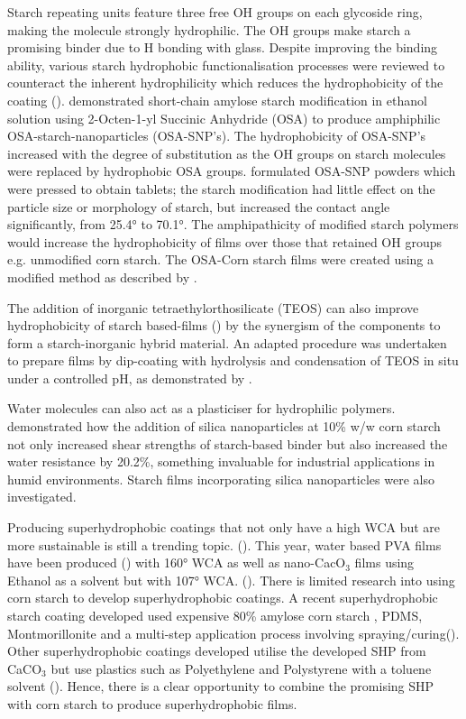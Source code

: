 \par Starch repeating units feature three free OH groups on each glycoside ring, making the molecule strongly hydrophilic. The OH groups make starch a promising binder due to H bonding with glass. Despite improving the binding ability, various starch hydrophobic functionalisation processes were reviewed to counteract the inherent hydrophilicity which reduces the hydrophobicity of the coating (\cite{wang}). \cite{jiang_dai_qin_xiong_sun_2016} demonstrated short-chain amylose starch modification in ethanol solution using 2-Octen-1-yl Succinic Anhydride (OSA) to produce amphiphilic OSA-starch-nanoparticles (OSA-SNP’s). The hydrophobicity of OSA-SNP’s increased with the degree of substitution as the OH groups on starch molecules were replaced by hydrophobic OSA groups. \cite{yu_jiang_zheng_cao_hou_xu_wang_jiang_pan_2019} formulated OSA-SNP powders which were pressed to obtain tablets; the starch modification had little effect on the particle size or morphology of starch, but increased the contact angle significantly, from 25.4° to 70.1°. The amphipathicity of modified starch polymers would increase the hydrophobicity of films over those that retained OH groups e.g.  unmodified corn starch. The OSA-Corn starch films were created using a modified method as described by \cite{OMSProcess}. 
\par The addition of inorganic tetraethylorthosilicate (TEOS) can also improve hydrophobicity of starch based-films (\cite{TEOS}) by the synergism of the components to form a starch-inorganic hybrid material. An adapted procedure was undertaken to prepare films by dip-coating with hydrolysis and condensation of TEOS in situ under a controlled pH, as demonstrated by \cite{TEOS}. 
\par Water molecules can also act as a plasticiser for hydrophilic polymers. \cite{wang_gu_hong_cheng_li_2011} demonstrated how the addition of silica nanoparticles at 10\% w/w corn starch not only increased shear strengths of starch-based binder but also increased the water resistance by 20.2\%, something invaluable for industrial applications in humid environments. Starch films incorporating silica nanoparticles were also investigated.

Producing superhydrophobic coatings that not only have a high WCA but are more sustainable is still a trending topic. (\cite{ECOSHS}). This year, water based PVA films have been produced (\cite{rewritable}) with 160° WCA as well as nano-CacO$_3$  films using Ethanol as a solvent but with 107° WCA. (\cite{syafiq_vengadaesvaran_ahmed_rahim_pandey_bushroa_ramesh_ramesh_2020}). There is limited research into using corn starch to develop superhydrophobic coatings. A recent superhydrophobic starch coating developed used expensive 80\% amylose corn starch , PDMS, Montmorillonite and a multi-step application process involving spraying/curing(\cite{chen_liu_yu_duan_ji_chen_2020}). Other superhydrophobic coatings developed utilise the developed SHP from CaCO$_3$ but use plastics such as Polyethylene and Polystyrene with a toluene solvent (\cite{Vatsal}).  Hence, there is a clear opportunity to combine the promising SHP with corn starch to produce superhydrophobic films. 

